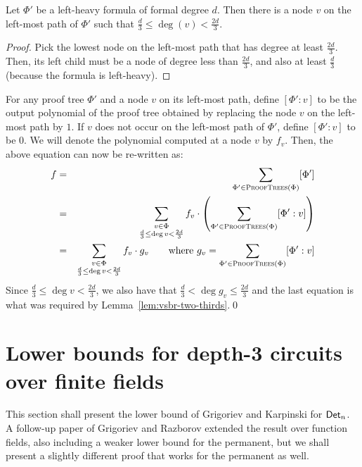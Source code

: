 \documentclass{birkjour}
\begin{document}
\begin{lemma}\label{lem:brent-two-thirds}
  Let $\Phi'$ be a left-heavy formula of formal degree $d$. Then there
  is a node $v$ on the left-most path of $\Phi'$ such that
  $\frac{d}{3}\leq \deg(v)< \frac{2d}{3}$.
\end{lemma}
\begin{proof}
  Pick the lowest node on the left-most path that has degree at least
  $\frac{2d}{3}$. Then, its left child must be a node of degree less
  than $\frac{2d}{3}$, and also at least $\frac{d}{3}$ (because the
  formula is left-heavy). 
\end{proof}

For any proof tree $\Phi'$ and a node $v$ on its left-most path,
define $[\Phi':v]$ to be the output polynomial of the proof tree 
obtained by replacing the node $v$ on the left-most path by $1$. 
If $v$ does not occur on the
left-most path of $\Phi'$, define $[\Phi':v]$ to be $0$. We will 
denote the polynomial computed at a node $v$ by $f_{v}$. Then, the
above equation can now be re-written as:
\begin{eqnarray*}
f & = & \sum_{\Phi' \in \textsc{ProofTrees}(\Phi)} [\Phi']\\
  & = & \sum_{\substack{v\in \Phi\\ \frac{d}{3}\leq \deg{v} < \frac{2d}{3}}} f_{v} \cdot \left( \sum_{\Phi'\in \textsc{ProofTrees}(\Phi)} [\Phi':v]\right)\\
  & = & \sum_{\substack{v\in \Phi\\ \frac{d}{3}\leq \deg{v} < \frac{2d}{3}}} f_{v} \cdot g_v\quad\quad\text{where $g_v = \sum_{\Phi'\in \textsc{ProofTrees}(\Phi)} [\Phi':v]$} \\
\end{eqnarray*}
Since $\frac{d}{3} \leq \deg{v} < \frac{2d}{3}$, we also have that
$\frac{d}{3} < \deg{g_v} \leq \frac{2d}{3}$ and the last equation is
what was required by Lemma~\ref{lem:vsbr-two-thirds}.\qed




\section{Lower bounds for depth-3 circuits over finite fields}

This section shall present the lower bound of Grigoriev and Karpinski
\cite{grigoriev98} for $\mathsf{Det}_n$. A follow-up paper of Grigoriev and
Razborov \cite{gr00} extended the result over function fields, also
including a weaker lower bound for the permanent, but we shall present a slightly different proof that works for the permanent as well. 
\end{document}
